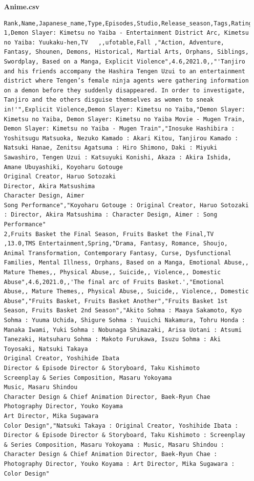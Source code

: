 \noindent\textbf{Anime.csv}
\begin{verbatim}
Rank,Name,Japanese_name,Type,Episodes,Studio,Release_season,Tags,Rating,Release_year,End_year,Description,Content_Warning,Related_Mange,Related_anime,Voice_actors,staff
1,Demon Slayer: Kimetsu no Yaiba - Entertainment District Arc, Kimetsu no Yaiba: Yuukaku-hen,TV   ,,ufotable,Fall ,"Action, Adventure, Fantasy, Shounen, Demons, Historical, Martial Arts, Orphans, Siblings, Swordplay, Based on a Manga, Explicit Violence",4.6,2021.0,,"'Tanjiro and his friends accompany the Hashira Tengen Uzui to an entertainment district where Tengen’s female ninja agents were gathering information on a demon before they suddenly disappeared. In order to investigate, Tanjiro and the others disguise themselves as women to sneak in!'",Explicit Violence,Demon Slayer: Kimetsu no Yaiba,"Demon Slayer: Kimetsu no Yaiba, Demon Slayer: Kimetsu no Yaiba Movie - Mugen Train, Demon Slayer: Kimetsu no Yaiba - Mugen Train","Inosuke Hashibira : Yoshitsugu Matsuoka, Nezuko Kamado : Akari Kitou, Tanjirou Kamado : Natsuki Hanae, Zenitsu Agatsuma : Hiro Shimono, Daki : Miyuki Sawashiro, Tengen Uzui : Katsuyuki Konishi, Akaza : Akira Ishida, Amane Ubuyashiki, Koyoharu Gotouge
Original Creator, Haruo Sotozaki
Director, Akira Matsushima
Character Design, Aimer
Song Performance","Koyoharu Gotouge : Original Creator, Haruo Sotozaki : Director, Akira Matsushima : Character Design, Aimer : Song Performance"
2,Fruits Basket the Final Season, Fruits Basket the Final,TV   ,13.0,TMS Entertainment,Spring,"Drama, Fantasy, Romance, Shoujo, Animal Transformation, Contemporary Fantasy, Curse, Dysfunctional Families, Mental Illness, Orphans, Based on a Manga, Emotional Abuse,, Mature Themes,, Physical Abuse,, Suicide,, Violence,, Domestic Abuse",4.6,2021.0,,'The final arc of Fruits Basket.',"Emotional Abuse,, Mature Themes,, Physical Abuse,, Suicide,, Violence,, Domestic Abuse","Fruits Basket, Fruits Basket Another","Fruits Basket 1st Season, Fruits Basket 2nd Season","Akito Sohma : Maaya Sakamoto, Kyo Sohma : Yuuma Uchida, Shigure Sohma : Yuuichi Nakamura, Tohru Honda : Manaka Iwami, Yuki Sohma : Nobunaga Shimazaki, Arisa Uotani : Atsumi Tanezaki, Hatsuharu Sohma : Makoto Furukawa, Isuzu Sohma : Aki Toyosaki, Natsuki Takaya
Original Creator, Yoshihide Ibata
Director & Episode Director & Storyboard, Taku Kishimoto
Screenplay & Series Composition, Masaru Yokoyama
Music, Masaru Shindou
Character Design & Chief Animation Director, Baek-Ryun Chae
Photography Director, Youko Koyama
Art Director, Mika Sugawara
Color Design","Natsuki Takaya : Original Creator, Yoshihide Ibata : Director & Episode Director & Storyboard, Taku Kishimoto : Screenplay & Series Composition, Masaru Yokoyama : Music, Masaru Shindou : Character Design & Chief Animation Director, Baek-Ryun Chae : Photography Director, Youko Koyama : Art Director, Mika Sugawara : Color Design"

\end{verbatim}
